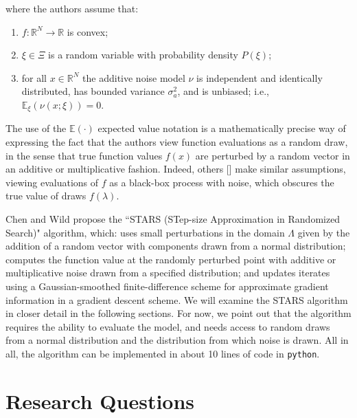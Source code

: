 \documentclass{amsart}
\newcommand{\R}{\mathbb{R}}
\begin{document}
\noindent where the authors assume that:

\begin{enumerate}[(i.)]

\item $f: \R^N \to \R$ is convex;

\item $\xi \in \Xi$ is a random variable with probability density $P(\xi)$;

\item for all $x \in \R^N$ the additive noise model $\nu$ is independent and identically distributed, has bounded variance $\sigma_a^2$, and is unbiased; i.e., $\mathbb{E}_\xi (\nu(x;\xi))=0$.



\end{enumerate}

The use of the $\mathbb{E}(\cdot)$ expected value notation is a mathematically precise way of expressing the fact that the authors view function evaluations as a random draw, in the sense that true function values $f(x)$ are perturbed by a random vector in an additive or multiplicative fashion. Indeed, others [] make similar assumptions, viewing evaluations of $f$ as a black-box process with noise, which obscures the true value of draws $f(\lambda)$.

Chen and Wild propose the ``STARS (STep-size Approximation in Randomized Search)" algorithm, which: uses small perturbations in the domain $\Lambda$ given by the addition of a random vector with components drawn from a normal distribution; computes the function value at the randomly perturbed point with additive or multiplicative noise drawn from a specified distribution; and updates iterates using a Gaussian-smoothed finite-difference scheme for approximate gradient information in a gradient descent scheme. We will examine the STARS algorithm in closer detail in the following sections. For now, we point out that the algorithm requires the ability to evaluate the model, and needs access to random draws from a normal distribution and the distribution from which noise is drawn. All in all, the algorithm can be implemented in about 10 lines of code in \texttt{python}.





\section{Research Questions}
\end{document}

